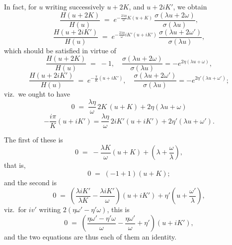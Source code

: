 \documentclass[11pt]{article}
\begin{document}
In fact, for $u$ writing successively $u + 2K$, and $u + 2iK'$, we obtain
\[
\frac{H(u + 2K)}{H(u)} \;=\; e^{-\tfrac{2\lambda\eta}{\omega}K(u + K)}\,\frac{\sigma(\lambda u + 2\omega)}{\sigma(\lambda u)},
\]
\[
\frac{H(u + 2iK')}{H(u)} \;=\; e^{-\tfrac{2\lambda\eta}{\omega}iK'(u + iK')}\,\frac{\sigma(\lambda u + 2\omega')}{\sigma(\lambda u)},
\]
which should be satisfied in virtue of
\[
\frac{H(u + 2K)}{H(u)} \;=\; -1,\quad \frac{\sigma(\lambda u + 2\omega)}{\sigma(\lambda u)} = -e^{2\eta(\lambda u + \omega)},
\]
\[
\frac{H(u + 2iK')}{H(u)} \;=\; e^{-\tfrac{\pi}{K}(u + iK')},\quad \frac{\sigma(\lambda u + 2\omega')}{\sigma(\lambda u)} = -e^{2\eta'(\lambda u + \omega')};
\]
viz.\ we ought to have
\[
0 \;=\; \frac{\lambda\eta}{\omega}\,2K\,(u + K) + 2\eta(\lambda u + \omega)
\]
\[
-\frac{i\pi}{K}(u + iK') = \frac{\lambda\eta}{\omega}\,2iK'(u + iK') + 2\eta'(\lambda u + \omega').
\]

The first of these is
\[
0 \;=\; -\frac{\lambda K}{\omega}(u + K) + \!\left(\lambda + \frac{\omega}{\lambda}\right)\!,
\]
that is,
\[
0 \;=\; (-1 + 1)(u + K);
\]
and the second is
\[
0 \;=\; \!\left(\frac{\lambda iK'}{\lambda K} - \frac{\lambda iK'}{\omega}\right)\!(u + iK') + \eta'\!\left(u + \frac{\omega'}{\lambda}\right),
\]
viz.\ for $iv'$ writing $2(\eta\omega' - \eta'\omega)$, this is
\[
0 \;=\; \!\left(\frac{\eta\omega' - \eta'\omega}{\omega} - \frac{\eta\omega'}{\omega} + \eta'\right)\!(u + iK'),
\]
and the two equations are thus each of them an identity.

\medskip
\end{document}
